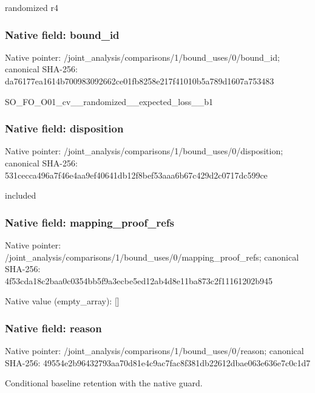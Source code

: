 \documentclass[10pt,a4paper]{article}
\begin{document}
\begingroup\raggedright\sloppy randomized r4\par\endgroup

\subsubsection{Native field: bound\_\allowbreak{}id}
Native pointer: /joint\_\allowbreak{}analysis/comparisons/1/bound\_\allowbreak{}uses/0/bound\_\allowbreak{}id; canonical SHA-256: da76177ea1614b700983092662ce01fb8258e217f41010b5a789d1607a753483

\begingroup\raggedright\sloppy SO\_\allowbreak{}FO\_\allowbreak{}O01\_\allowbreak{}cv\_\allowbreak{}\_\allowbreak{}randomized\_\allowbreak{}\_\allowbreak{}expected\_\allowbreak{}loss\_\allowbreak{}\_\allowbreak{}b1\par\endgroup

\subsubsection{Native field: disposition}
Native pointer: /joint\_\allowbreak{}analysis/comparisons/1/bound\_\allowbreak{}uses/0/disposition; canonical SHA-256: 531cecca496a7f46e4aa9ef40641db12f8bef53aaa6b67c429d2c0717dc599ce

\begingroup\raggedright\sloppy included\par\endgroup

\subsubsection{Native field: mapping\_\allowbreak{}proof\_\allowbreak{}refs}
Native pointer: /joint\_\allowbreak{}analysis/comparisons/1/bound\_\allowbreak{}uses/0/mapping\_\allowbreak{}proof\_\allowbreak{}refs; canonical SHA-256: 4f53cda18c2baa0c0354bb5f9a3ecbe5ed12ab4d8e11ba873c2f11161202b945

Native value (empty\_\allowbreak{}array): []

\subsubsection{Native field: reason}
Native pointer: /joint\_\allowbreak{}analysis/comparisons/1/bound\_\allowbreak{}uses/0/reason; canonical SHA-256: 49554e2b96432793aa70d81e4c9ac7fac8f381db22612dbae063e636e7c0c1d7

\begingroup\raggedright\sloppy Conditional baseline retention with the native guard.\par\endgroup
\end{document}
